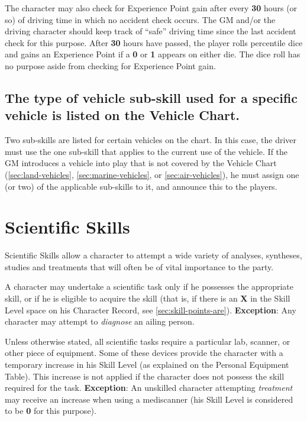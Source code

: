 The character may also check for Experience Point gain after every
\textbf{30} hours (or so) of driving time in which no accident check
occurs.  The GM and/or the driving character should keep track of
``safe'' driving time since the last accident check for this purpose.
After \textbf{30} hours have passed, the player rolls percentile dice
and gains an Experience Point if a \textbf{0} or \textbf{1} appears on
either die.  The dice roll has no purpose aside from checking for
Experience Point gain.

\subsection[Vehicle Types and Sub-Skills]{The type of vehicle
  sub-skill used for a  specific vehicle is listed on the Vehicle
  Chart.}
\label{sec:vehtypes}

Two sub-skills are listed for certain vehicles on the chart.  In this
case, the driver must use the one sub-skill that applies to the
current use of the vehicle.  If the GM introduces a vehicle into play
that is not covered by the Vehicle Chart (\ref{sec:land-vehicles},
\ref{sec:marine-vehicles}, or \ref{sec:air-vehicles}), he must assign
one (or two) of the applicable sub-skills to it, and announce this to
the players.


\section{Scientific Skills}
\label{sec:scientific-skills}

Scientific Skills allow a character to attempt a wide variety of
analyses, syntheses, studies and treatments that will often be of
vital importance to the party.

A character may undertake a scientific task only if he possesses the
appropriate skill, or if he is eligible to acquire the skill (that is,
if there is an \textbf{\textsf{X}} in the Skill Level space on his
Character Record, see \ref{sec:skill-points-are}).
\textbf{Exception}: Any character may attempt to \emph{diagnose} an
ailing person.

Unless otherwise stated, all scientific tasks require a particular
lab, scanner, or other piece of equipment.  Some of these devices
provide the character with a temporary increase in his Skill Level (as
explained on the Personal Equipment Table).  This increase is not
applied if the character does not possess the skill required for the
task.  \textbf{Exception}: An unskilled character attempting
\emph{treatment} may receive an increase when using a mediscanner (his
Skill Level is considered to be \textbf{0} for this purpose).

